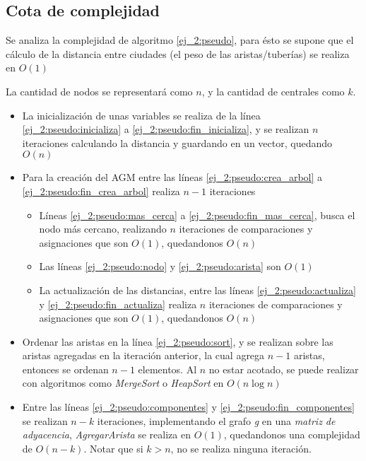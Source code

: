 \subsection{Cota de complejidad} \label{ej_2:cota}

Se analiza la complejidad de algoritmo \ref{ej_2:pseudo}, para \'esto se supone que el c\'alculo de la distancia entre ciudades (el peso de las aristas/tuber\'ias) se realiza en $O(1)$

La cantidad de nodos se representar\'a como $n$, y la cantidad de centrales como $k$.

\begin{itemize}
	\item La inicializaci\'on de unas variables se realiza de la l\'inea \ref{ej_2:pseudo:inicializa} a \ref{ej_2:pseudo:fin_inicializa}, y se realizan $n$ iteraciones calculando la distancia y guardando en un vector, quedando $O(n)$
	\item Para la creaci\'on del AGM entre las l\'ineas \ref{ej_2:pseudo:crea_arbol} a \ref{ej_2:pseudo:fin_crea_arbol} realiza $n - 1$ iteraciones
	\begin{itemize}
		\item L\'ineas \ref{ej_2:pseudo:mas_cerca} a \ref{ej_2:pseudo:fin_mas_cerca}, busca el nodo m\'as cercano, realizando $n$ iteraciones de comparaciones y asignaciones que son $O(1)$, quedandonos $O(n)$
		\item Las l\'ineas \ref{ej_2:pseudo:nodo} y \ref{ej_2:pseudo:arista} son $O(1)$
		\item La actualizaci\'on de las distancias, entre las l\'ineas \ref{ej_2:pseudo:actualiza} y \ref{ej_2:pseudo:fin_actualiza} realiza $n$ iteraciones de comparaciones y asignaciones que son $O(1)$, quedandonos $O(n)$
	\end{itemize}
	\item Ordenar las aristas en la l\'inea \ref{ej_2:pseudo:sort}, y se realizan sobre las aristas agregadas en la iteraci\'on anterior, la cual agrega $n-1$ aristas, entonces se ordenan $n - 1$ elementos. Al $n$ no estar acotado, se puede realizar con algoritmos como \emph{MergeSort} o \emph{HeapSort} en $O(n \log n)$
	\item Entre las l\'ineas \ref{ej_2:pseudo:componentes} y \ref{ej_2:pseudo:fin_componentes} se realizan $n - k$ iteraciones, implementando el grafo \emph{g} en una \emph{matriz de adyacencia}, \emph{AgregarArista} se realiza en $O(1)$, quedandonos una complejidad de $O(n - k)$. Notar que si $k > n$, no se realiza ninguna iteraci\'on.
\end{itemize}

